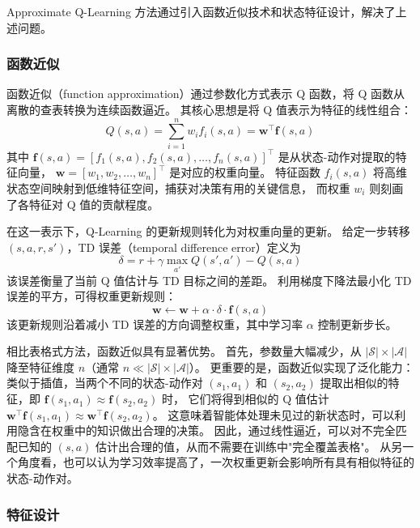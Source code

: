 Approximate Q-Learning 方法通过引入函数近似技术和状态特征设计，解决了上述问题。

\subsubsection{函数近似}

函数近似（function approximation）通过参数化方式表示 Q 函数，将 Q 函数从离散的查表转换为连续函数逼近。
其核心思想是将 Q 值表示为特征的线性组合：
\begin{equation}
    \label{eq:approx_q}
    Q(s,a) = \sum_{i=1}^n w_i f_i(s,a) = \mathbf{w}^\top \mathbf{f}(s,a)
\end{equation}
其中 $\mathbf{f}(s,a) = [f_1(s,a), f_2(s,a), \ldots, f_n(s,a)]^\top$ 是从状态-动作对提取的特征向量，
$\mathbf{w} = [w_1, w_2, \ldots, w_n]^\top$ 是对应的权重向量。
特征函数 $f_i(s,a)$ 将高维状态空间映射到低维特征空间，捕获对决策有用的关键信息，
而权重 $w_i$ 则刻画了各特征对 Q 值的贡献程度。

在这一表示下，Q-Learning 的更新规则转化为对权重向量的更新。
给定一步转移 $(s, a, r, s')$，TD 误差（temporal difference error）定义为
\begin{equation}
    \label{eq:td_error}
    \delta = r + \gamma \max_{a'} Q(s', a') - Q(s,a)
\end{equation}
该误差衡量了当前 Q 值估计与 TD 目标之间的差距。
利用梯度下降法最小化 TD 误差的平方，可得权重更新规则：
\begin{equation}
    \label{eq:weight_update}
    \mathbf{w} \leftarrow \mathbf{w} + \alpha \cdot \delta \cdot \mathbf{f}(s,a)
\end{equation}
该更新规则沿着减小 TD 误差的方向调整权重，其中学习率 $\alpha$ 控制更新步长。

相比表格式方法，函数近似具有显著优势。
首先，参数量大幅减少，从 $|\mathcal{S}| \times |\mathcal{A}|$ 降至特征维度 $n$（通常 $n \ll |\mathcal{S}| \times |\mathcal{A}|$）。
更重要的是，函数近似实现了泛化能力：
类似于插值，当两个不同的状态-动作对 $(s_1, a_1)$ 和 $(s_2, a_2)$ 提取出相似的特征，即 $\mathbf{f}(s_1, a_1) \approx \mathbf{f}(s_2, a_2)$ 时，
它们将得到相似的 Q 值估计 $\mathbf{w}^\top \mathbf{f}(s_1, a_1) \approx \mathbf{w}^\top \mathbf{f}(s_2, a_2)$。
这意味着智能体处理未见过的新状态时，可以利用隐含在权重中的知识做出合理的决策。
因此，通过线性逼近，可以对不完全匹配已知的 $(s,a)$ 估计出合理的值，从而不需要在训练中"完全覆盖表格"。
从另一个角度看，也可以认为学习效率提高了，一次权重更新会影响所有具有相似特征的状态-动作对。

\subsubsection{特征设计}

